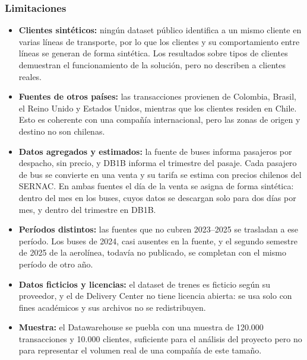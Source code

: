 \subsubsection{Limitaciones}
\label{sec:limitaciones}

\begin{itemize}[leftmargin=*]
  \item \textbf{Clientes sintéticos:} ningún dataset público identifica a un
        mismo cliente en varias líneas de transporte, por lo que los clientes
        y su comportamiento entre líneas se generan de forma sintética. Los
        resultados sobre tipos de clientes demuestran el funcionamiento de la
        solución, pero no describen a clientes reales.
  \item \textbf{Fuentes de otros países:} las transacciones provienen de
        Colombia, Brasil, el Reino Unido y Estados Unidos, mientras que los
        clientes residen en Chile. Esto es coherente con una compañía
        internacional, pero las zonas de origen y destino no son chilenas.
  \item \textbf{Datos agregados y estimados:} la fuente de buses informa
        pasajeros por despacho, sin precio, y DB1B informa el trimestre del
        pasaje. Cada pasajero de bus se convierte en una venta y su tarifa se
        estima con precios chilenos del SERNAC. En ambas fuentes el día de la
        venta se asigna de forma sintética: dentro del mes en los buses, cuyos
        datos se descargan solo para dos días por mes, y dentro del trimestre
        en DB1B.
  \item \textbf{Períodos distintos:} las fuentes que no cubren 2023--2025 se
        trasladan a ese período. Los buses de 2024, casi ausentes en la fuente,
        y el segundo semestre de 2025 de la aerolínea, todavía no publicado, se
        completan con el mismo período de otro año.
  \item \textbf{Datos ficticios y licencias:} el dataset de trenes es ficticio
        según su proveedor, y el de Delivery Center no tiene licencia abierta:
        se usa solo con fines académicos y sus archivos no se redistribuyen.
  \item \textbf{Muestra:} el Datawarehouse se puebla con una muestra de 120.000
        transacciones y 10.000 clientes, suficiente para el análisis del
        proyecto pero no para representar el volumen real de una compañía de
        este tamaño.
\end{itemize}
